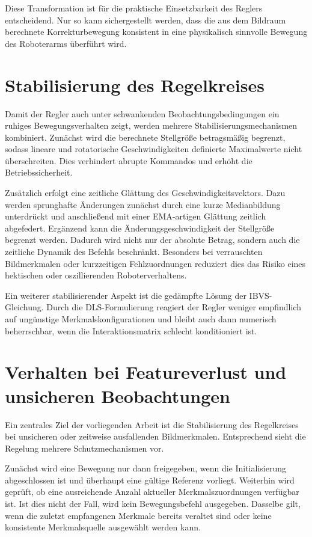 Diese Transformation ist für die praktische Einsetzbarkeit des Reglers entscheidend. Nur so kann sichergestellt werden, dass die aus dem Bildraum berechnete Korrekturbewegung konsistent in eine physikalisch sinnvolle Bewegung des Roboterarms überführt wird.

\section{Stabilisierung des Regelkreises}
\label{sec:stabilisierung_regelkreis}

Damit der Regler auch unter schwankenden Beobachtungsbedingungen ein ruhiges Bewegungsverhalten zeigt, werden mehrere Stabilisierungsmechanismen kombiniert. Zunächst wird die berechnete Stellgröße betragsmäßig begrenzt, sodass lineare und rotatorische Geschwindigkeiten definierte Maximalwerte nicht überschreiten. Dies verhindert abrupte Kommandos und erhöht die Betriebssicherheit.

Zusätzlich erfolgt eine zeitliche Glättung des Geschwindigkeitsvektors. Dazu werden sprunghafte Änderungen zunächst durch eine kurze Medianbildung unterdrückt und anschließend mit einer \ac{EMA}-artigen Glättung zeitlich abgefedert. Ergänzend kann die Änderungsgeschwindigkeit der Stellgröße begrenzt werden. Dadurch wird nicht nur der absolute Betrag, sondern auch die zeitliche Dynamik des Befehls beschränkt. Besonders bei verrauschten Bildmerkmalen oder kurzzeitigen Fehlzuordnungen reduziert dies das Risiko eines hektischen oder oszillierenden Roboterverhaltens.

Ein weiterer stabilisierender Aspekt ist die gedämpfte Lösung der \ac{IBVS}-Gleichung. Durch die \ac{DLS}-Formulierung reagiert der Regler weniger empfindlich auf ungünstige Merkmalskonfigurationen und bleibt auch dann numerisch beherrschbar, wenn die Interaktionsmatrix schlecht konditioniert ist.

\section{Verhalten bei Featureverlust und unsicheren Beobachtungen}
\label{sec:verhalten_featureverlust}

Ein zentrales Ziel der vorliegenden Arbeit ist die Stabilisierung des Regelkreises bei unsicheren oder zeitweise ausfallenden Bildmerkmalen. Entsprechend sieht die Regelung mehrere Schutzmechanismen vor.

Zunächst wird eine Bewegung nur dann freigegeben, wenn die Initialisierung abgeschlossen ist und überhaupt eine gültige Referenz vorliegt. Weiterhin wird geprüft, ob eine ausreichende Anzahl aktueller Merkmalszuordnungen verfügbar ist. Ist dies nicht der Fall, wird kein Bewegungsbefehl ausgegeben. Dasselbe gilt, wenn die zuletzt empfangenen Merkmale bereits veraltet sind oder keine konsistente Merkmalsquelle ausgewählt werden kann.

